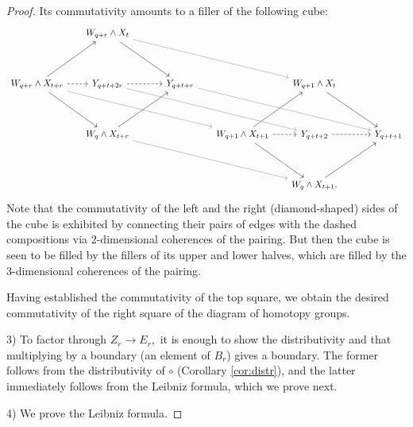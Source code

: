\documentclass{amsart}
\theoremstyle{definition}
\begin{document}
\begin{proof}
Its commutativity amounts to a filler of the following cube:
    \[\begin{tikzcd}[row sep=3.8em, column sep=1.6em]
    	& {W_{q+r} \wedge X_t} \\
    	{W_{q+r} \wedge X_{t+r}} & {Y_{q+t+2r}} &[1.6em] {Y_{q+t+r}} && {W_{q+1} \wedge X_t} \\
    	& {W_{q} \wedge X_{t+r}} && {W_{q+1} \wedge X_{t+1}} & {Y_{q+t+2}} &[1.6em] {Y_{q+t+1}} \\
    	&&&& {W_{q} \wedge X_{t+1}.}
    	\arrow[from=2-1, to=1-2]
    	\arrow[from=1-2, to=2-3]
    	\arrow[from=2-1, to=3-2]
    	\arrow[from=3-2, to=2-3]
    	\arrow[dashed, from=2-1, to=2-2]
    	\arrow[dashed, from=2-2, to=2-3]
    	\arrow[from=3-4, to=2-5]
    	\arrow[from=2-5, to=3-6]
    	\arrow[from=3-4, to=4-5]
    	\arrow[from=4-5, to=3-6]
    	\arrow[dashed, from=3-4, to=3-5]
    	\arrow[dashed, from=3-5, to=3-6]
    	\arrow[color=black!50, from=1-2, to=2-5]
    	\arrow[color=black!50, from=2-1, to=3-4]
    	\arrow[color=black!50, from=2-2, to=3-5]
    	\arrow[color=black!50, from=2-3, to=3-6]
    	\arrow[color=black!50, from=3-2, to=4-5]
    \end{tikzcd}\]
Note that the commutativity of the left and the right (diamond-shaped) sides of the cube is exhibited by connecting their pairs of edges with the dashed compositions via 2-dimensional coherences of the pairing. But then the cube is seen to be filled by the fillers of its upper and lower halves, which are filled by the 3-dimensional coherences of the pairing.

Having established the commutativity of the top square, we obtain the desired commutativity of the right square of the diagram of homotopy groups.

3) To factor through $Z_r \to E_r,$ it is enough to show the distributivity and that multiplying by a boundary (an element of $B_r$) gives a boundary. The former follows from the distributivity of $\circ$ (Corollary \ref{cor:distr}), and the latter immediately follows from the Leibniz formula, which we prove next.

4) We prove the Leibniz formula.


\end{proof}
\end{document}
